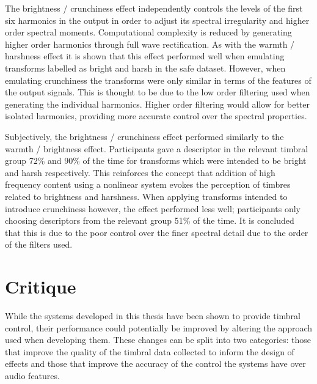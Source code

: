 	The brightness / crunchiness effect independently controls the levels of the first six harmonics in the output in
	order to adjust its spectral irregularity and higher order spectral moments. Computational complexity is reduced by
	generating higher order harmonics through full wave rectification. As with the warmth / harshness effect it is shown
	that this effect performed well when emulating transforms labelled as bright and harsh in the \acrshort{safe}
	dataset. However, when emulating crunchiness the transforms were only similar in terms of the features of the output
	signals. This is thought to be due to the low order filtering used when generating the individual harmonics. Higher
	order filtering would allow for better isolated harmonics, providing more accurate control over the spectral
	properties.

	Subjectively, the brightness / crunchiness effect performed similarly to the warmth / brightness effect.
	Participants gave a descriptor in the relevant timbral group 72\% and 90\% of the time for transforms which were
	intended to be bright and harsh respectively. This reinforces the concept that addition of high frequency content
	using a nonlinear system evokes the perception of timbres related to brightness and harshness. When applying
	transforms intended to introduce crunchiness however, the effect performed less well; participants only choosing
	descriptors from the relevant group 51\% of the time. It is concluded that this is due to the poor control over the
	finer spectral detail due to the order of the filters used.

\section{Critique}
\label{sec:Conclusion-Critique}
	While the systems developed in this thesis have been shown to provide timbral control, their performance could
	potentially be improved by altering the approach used when developing them. These changes can be split into two
	categories: those that improve the quality of the timbral data collected to inform the design of effects and those
	that improve the accuracy of the control the systems have over audio features.

